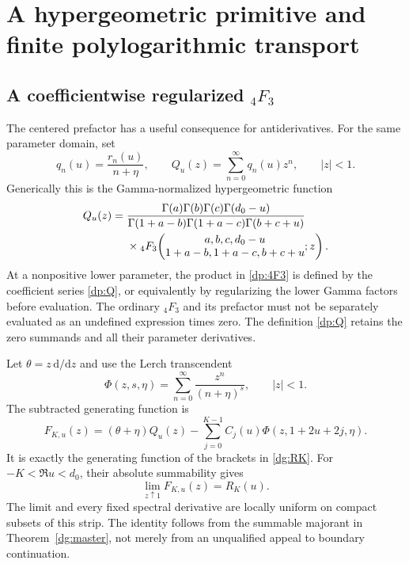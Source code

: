 \documentclass[11pt,a4paper]{article}
\numberwithin{equation}{section}
\theoremstyle{definition}
\theoremstyle{remark}
\begin{document}

\section{A hypergeometric primitive and finite polylogarithmic transport}
\label{dp:section}

\subsection{A coefficientwise regularized \texorpdfstring{${}_4F_3$}{4F3}}
The centered prefactor has a useful consequence for antiderivatives.
For the same parameter domain, set
\begin{equation}\label{dp:Q}
 q_n(u)=\frac{r_n(u)}{n+\eta},\qquad
 Q_u(z)=\sum_{n=0}^{\infty}q_n(u)z^n,\qquad |z|<1.
\end{equation}
Generically this is the Gamma-normalized hypergeometric function
\begin{align}
 Q_u(z)={}&
 \frac{\Gamma(a)\Gamma(b)\Gamma(c)\Gamma(d_0-u)}
 {\Gamma(1+a-b)\Gamma(1+a-c)\Gamma(b+c+u)}\notag\\
 &\times{}_4F_3\!\left(\begin{matrix}
 a,b,c,d_0-u\\1+a-b,1+a-c,b+c+u
 \end{matrix};z\right).
 \label{dp:4F3}
\end{align}
At a nonpositive lower parameter, the product in \eqref{dp:4F3} is
defined by the coefficient series \eqref{dp:Q}, or equivalently by
regularizing the lower Gamma factors before evaluation. The ordinary
${}_4F_3$ and its prefactor must not be separately evaluated as an
undefined expression times zero. The definition \eqref{dp:Q} retains
the zero summands and all their parameter derivatives.

Let $\theta=z\,\mathrm d/\mathrm dz$ and use the Lerch transcendent
\cite[Section 25.14]{dlmf-lerch}
\[
 \Phi(z,s,\eta)=\sum_{n=0}^{\infty}\frac{z^n}{(n+\eta)^s},
 \qquad |z|<1.
\]
The subtracted generating function is
\begin{equation}\label{dp:F}
 F_{K,u}(z)=(\theta+\eta)Q_u(z)
        -\sum_{j=0}^{K-1}C_j(u)\Phi(z,1+2u+2j,\eta).
\end{equation}
It is exactly the generating function of the brackets in
\eqref{dg:RK}. For $-K<\Re u<d_0$, their absolute summability gives
\begin{equation}\label{dp:endpoint}
 \lim_{z\uparrow1}F_{K,u}(z)=R_K(u).
\end{equation}
The limit and every fixed spectral derivative are locally uniform on
compact subsets of this strip. The identity follows from the
summable majorant in Theorem~\ref{dg:master}, not merely from an
unqualified appeal to boundary continuation.
\end{document}
